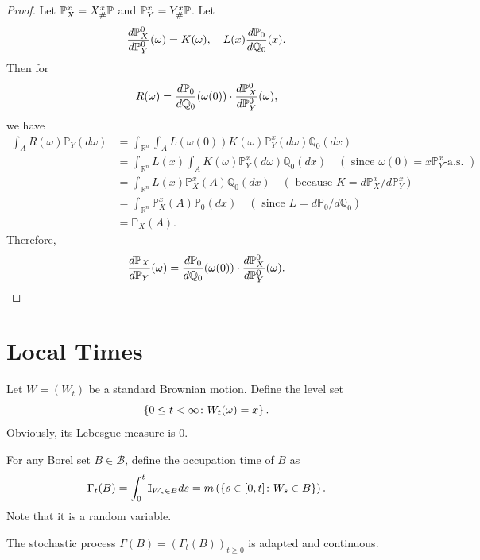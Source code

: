 \begin{proof}
    Let $\mathbb{P}^x_X = X^x_{\#}\mathbb{P}$ and $\mathbb{P}^x_Y = Y^x_{\#}\mathbb{P}$. Let
    \begin{equation*}
        \frac{d\mathbb{P}^0_X}{d\mathbb{P}^0_Y}(\omega) = K(\omega),\quad L(x)\frac{d\mathbb{P}_0}{d\mathbb{Q}_0}(x).
    \end{equation*}
    Then for 
    \begin{equation*}
        R(\omega) = \frac{d\mathbb{P}_0}{d\mathbb{Q}_0}(\omega(0))\cdot \frac{d\mathbb{P}^0_X}{d\mathbb{P}^0_Y}(\omega),
    \end{equation*}
    we have
    \begin{align*}
        \int_A R(\omega) \mathbb{P}_Y(d \omega) & =\int_{\mathbb{R}^n} \int_A L(\omega(0)) K(\omega) \mathbb{P}_Y^x(d \omega) \mathbb{Q}_0(d x) \\
        & =\int_{\mathbb{R}^n} L(x) \int_A K(\omega) \mathbb{P}_Y^x(d \omega) \mathbb{Q}_0(d x) \quad\left(\text { since } \omega(0)=x \mathbb{P}_Y^x \text {-a.s. }\right) \\
        & =\int_{\mathbb{R}^n} L(x) \mathbb{P}_X^x(A) \mathbb{Q}_0(d x) \quad\left(\text { because } K={d \mathbb{P}_X^x}/{d \mathbb{P}_Y^x}\right) \\
        & =\int_{\mathbb{R}^n} \mathbb{P}_X^x(A) \mathbb{P}_0(d x) \quad\left(\text { since } L=d \mathbb{P}_0 / d \mathbb{Q}_0\right) \\
        & =\mathbb{P}_X(A).
    \end{align*}
    Therefore,
    \begin{equation*}
        \frac{d\mathbb{P}_X}{d\mathbb{P}_Y}(\omega) = \frac{d\mathbb{P}_0}{d\mathbb{Q}_0}(\omega(0))\cdot \frac{d\mathbb{P}^0_X}{d\mathbb{P}^0_Y}(\omega). \qedhere
    \end{equation*}
\end{proof}

\section{Local Times}

Let $W=(W_t)$ be a standard Brownian motion. Define the level set
\begin{equation*}
    \left\{0 \leq t < \infty \colon W_t(\omega) = x\right\}.
\end{equation*}
Obviously, its Lebesgue measure is $0$.

\begin{defn}
    For any Borel set $B \in \mathcal{B}$, define the occupation time of $B$ as
    \begin{equation*}
        \Gamma_t(B) = \int_0^t \mathbb{I}_{W_s \in B} ds = m\left(\left\{ s \in [0,t] \colon W_s \in B \right\}\right).
    \end{equation*}
    Note that it is a random variable.
\end{defn}
\begin{rmk}
    The stochastic process $\Gamma(B) = (\Gamma_t(B))_{t\geq 0}$ is adapted and continuous.
\end{rmk}


